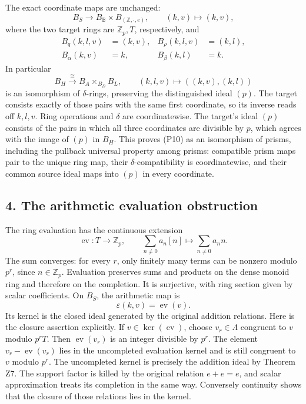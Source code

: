 \documentclass[
]{article}
\begin{document}
The exact coordinate maps are unchanged: \[
B_S\longrightarrow B_{\mathbb B}\times B_{(\mathbb Z,\cdot,e)},
\qquad(k,v)\longmapsto(k,v),
\tag{P8}
\] where the two target rings are \(\mathbb Z_p,T\), respectively, and
\[
\begin{aligned}
B_q(k,l,v)&=(k,v),&B_\rho(k,l,v)&=(k,l),\\
B_\alpha(k,v)&=k,&B_\beta(k,l)&=k.
\end{aligned}
\tag{P9}
\] In particular \[
B_H\xrightarrow{\ \cong\ }B_A\times_{B_D}B_L,
\qquad(k,l,v)\longmapsto((k,v),(k,l))
\tag{P10}
\] is an isomorphism of \(\delta\)-rings, preserving the distinguished
ideal \((p)\). The target consists exactly of those pairs with the same
first coordinate, so its inverse reads off \(k,l,v\). Ring operations
and \(\delta\) are coordinatewise. The target's ideal \((p)\) consists
of the pairs in which all three coordinates are divisible by \(p\),
which agrees with the image of \((p)\) in \(B_H\). This proves (P10) as
an isomorphism of prisms, including the pullback universal property
among prisms: compatible prism maps pair to the unique ring map, their
\(\delta\)-compatibility is coordinatewise, and their common source
ideal maps into \((p)\) in every coordinate.

\subsection{4. The arithmetic evaluation
obstruction}\label{the-arithmetic-evaluation-obstruction}

The ring evaluation has the continuous extension \[
\operatorname{ev}:T\longrightarrow\mathbb Z_p,
\qquad \sum_{n\ne0}a_n[n]\longmapsto\sum_{n\ne0}a_n n.
\tag{P11}
\] The sum converges: for every \(r\), only finitely many terms can be
nonzero modulo \(p^r\), since \(n\in\mathbb Z_p\). Evaluation preserves
sums and products on the dense monoid ring and therefore on the
completion. It is surjective, with ring section given by scalar
coefficients. On \(B_S\), the arithmetic map is \[
\varepsilon(k,v)=\operatorname{ev}(v).
\tag{P12}
\] Its kernel is the closed ideal generated by the original addition
relations. Here is the closure assertion explicitly. If
\(v\in\ker(\operatorname{ev})\), choose \(v_r\in\Lambda\) congruent to
\(v\) modulo \(p^rT\). Then \(\operatorname{ev}(v_r)\) is an integer
divisible by \(p^r\). The element \(v_r-\operatorname{ev}(v_r)\) lies in
the uncompleted evaluation kernel and is still congruent to \(v\) modulo
\(p^r\). The uncompleted kernel is precisely the addition ideal by
Theorem Z7. The support factor is killed by the original relation
\(e+e=e\), and scalar approximation treats its completion in the same
way. Conversely continuity shows that the closure of those relations
lies in the kernel.
\end{document}
